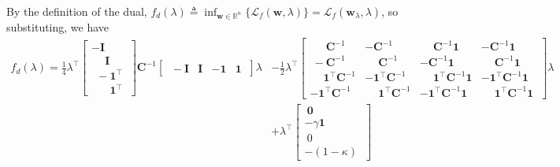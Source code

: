 \documentclass{article}
\numberwithin{equation}{section}
\begin{document}
By the definition of the dual, $ f_d(\lambda) \triangleq \inf_{\mathbf{w}
\in \mathbb{R}^n}\{\mathcal{L}_f(\mathbf{w}, \lambda)\} =
\mathcal{L}_f(\mathbf{w}_\lambda, \lambda) $, so substituting, we have
\begin{equation*}
    \begin{split}
    f_d(\lambda) = \frac{1}{4}\lambda^\top\begin{bmatrix}
        -\mathbf{I} \ \\ \phantom{-} \mathbf{I} \ \\ \ \ -\mathbf{1}^\top \ \\
        \ \ \phantom{-} \mathbf{1}^\top \
    \end{bmatrix}\mathbf{C}^{-1}\begin{bmatrix}
        \ -\mathbf{I} & \mathbf{I} & -\mathbf{1} & \mathbf{1} \
    \end{bmatrix}\lambda & - \frac{1}{2}\lambda^\top\begin{bmatrix}
        \ \phantom{-}\mathbf{C}^{-1} & -\mathbf{C}^{-1} &
        \phantom{-}\mathbf{C}^{-1}\mathbf{1} & -\mathbf{C}^{-1}\mathbf{1} \ \\
        \ -\mathbf{C}^{-1} & \phantom{-}\mathbf{C}^{-1} & 
        -\mathbf{C}^{-1}\mathbf{1} & \phantom{-}\mathbf{C}^{-1}\mathbf{1} \ \\
        \phantom{-}\mathbf{1}^\top\mathbf{C}^{-1} &
        -\mathbf{1}^\top\mathbf{C}^{-1} &
        \phantom{-}\mathbf{1}^\top\mathbf{C}^{-1}\mathbf{1} &
        -\mathbf{1}^\top\mathbf{C}^{-1}\mathbf{1} \ \\
        -\mathbf{1}^\top\mathbf{C}^{-1} &
        \phantom{-}\mathbf{1}^\top\mathbf{C}^{-1} &
        -\mathbf{1}^\top\mathbf{C}^{-1}\mathbf{1} &
        \phantom{-}\mathbf{1}^\top\mathbf{C}^{-1}\mathbf{1} \
    \end{bmatrix}\lambda \\
    & + \lambda^\top\begin{bmatrix}
        \ \mathbf{0} \ \\ -\gamma\mathbf{1} \ \\ \ 0 \ \\ -(1 - \kappa) \
    \end{bmatrix}
    \end{split}
\end{equation*}
\end{document}
